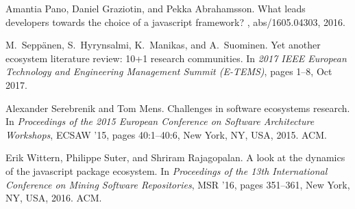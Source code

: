 \documentclass[10pt,conference]{IEEEtran}
\begin{document}
\begin{thebibliography}{00}
  Amantia Pano, Daniel Graziotin, and Pekka Abrahamsson.
  \newblock What leads developers towards the choice of a javascript framework?
  , abs/1605.04303, 2016.
  
  M.~{Seppänen}, S.~{Hyrynsalmi}, K.~{Manikas}, and A.~{Suominen}.
  \newblock Yet another ecosystem literature review: 10+1 research communities.
  \newblock In {\em 2017 IEEE European Technology and Engineering Management
    Summit (E-TEMS)}, pages 1--8, Oct 2017.
  
  Alexander Serebrenik and Tom Mens.
  \newblock Challenges in software ecosystems research.
  \newblock In {\em Proceedings of the 2015 European Conference on Software
    Architecture Workshops}, ECSAW '15, pages 40:1--40:6, New York, NY, USA,
    2015. ACM.
  
  Erik Wittern, Philippe Suter, and Shriram Rajagopalan.
  \newblock A look at the dynamics of the javascript package ecosystem.
  \newblock In {\em Proceedings of the 13th International Conference on Mining
    Software Repositories}, MSR '16, pages 351--361, New York, NY, USA, 2016.
    ACM.
  
  \end{thebibliography}
  
\vspace{12pt}
\end{document}
